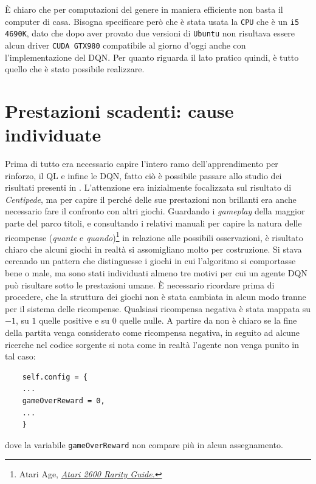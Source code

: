 \documentclass[twoside,twocolumn,10pt]{extarticle}
\theoremstyle{definition}
\begin{document}
		È chiaro che per computazioni del genere in maniera efficiente non basta il computer di casa. Bisogna specificare però che è stata usata la \texttt{CPU} che è un \texttt{i5 4690K}, dato che dopo aver provato due versioni di \texttt{Ubuntu} non risultava essere alcun driver \texttt{CUDA GTX980} compatibile al giorno d'oggi anche con l'implementazione del DQN. Per quanto riguarda il lato pratico quindi, è tutto quello che è stato possibile realizzare.
		
\section{Prestazioni scadenti: cause individuate}\label{sec:no}
	Prima di tutto era necessario capire l'intero ramo dell'apprendimento per rinforzo, il QL e infine le DQN, fatto ciò è possibile passare allo studio dei risultati presenti in \cite{bib:dqn}. L'attenzione era inizialmente focalizzata sul risultato di \textit{Centipede}, ma per capire il perché delle sue prestazioni non brillanti era anche necessario fare il confronto con altri giochi. Guardando i \textit{gameplay} della maggior parte del parco titoli, e consultando i relativi manuali per capire la natura delle ricompense (\textit{quante} e \textit{quando})\footnote{Atari Age, \emph{\href{https://atariage.com/software_search.php?SystemID=2600}{Atari 2600 Rarity Guide.}}} in relazione alle possibili osservazioni, è risultato chiaro che alcuni giochi in realtà si assomigliano molto per costruzione. Si stava cercando un pattern che distinguesse i giochi in cui l'algoritmo si comportasse bene o male, ma sono stati individuati almeno tre motivi per cui un agente DQN può risultare sotto le prestazioni umane. È necessario ricordare prima di procedere, che la struttura dei giochi non è stata cambiata in alcun modo tranne per il sistema delle ricompense. Qualsiasi ricompensa negativa è stata mappata su $-1$, su $1$ quelle positive e su $0$ quelle nulle. A partire da \cite{bib:dqn} non è chiaro se la fine della partita venga considerato come ricompensa negativa, in seguito ad alcune ricerche nel codice sorgente si nota come in realtà l'agente non venga punito in tal caso:
	\begin{verbatim}
	self.config = {
	...
	gameOverReward = 0,
	...
	}
	\end{verbatim}
	dove la variabile \texttt{gameOverReward} non compare più in alcun assegnamento.
\end{document}

